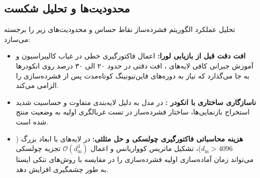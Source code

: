 \subsection{محدودیت‌ها و تحلیل شکست}
تحلیل عملکرد الگوریتم فشرده‌ساز  نقاط حساس و محدودیت‌های زیر را برجسته می‌سازد:
\begin{itemize}
    \item \textbf{افت دقت قبل از بازیابی لورا:} اعمال فاکتورگیری خطی در غیاب کالیبراسیون و آموزش جبرانی کافی لایه‌های ، افت دقتی در حدود ۲۰ الی ۳۰ درصد روی انکودرها به جا می‌گذارد که نیاز به دوره‌های فاین‌تیونینگ کوتاه‌مدت پس از فشرده‌سازی را الزامی می‌کند.
    \item \textbf{ناسازگاری ساختاری با انکودر :} در مدل  به دلیل لایه‌بندی متفاوت و حساسیت شدید استخراج بازنمایی‌ها، ساختار فشرده‌ساز در تست غربالگری اولیه به وضعیت  منتج شده است.
    \item \textbf{هزینه محاسباتی فاکتورگیری چولسکی و حل مثلثی:} در لایه‌های با ابعاد بزرگ ($d_{\text{in}} > 4096$)، تشکیل ماتریس کوواریانس و اعمال $\mathcal{O}(d_{\text{in}}^3)$ تجزیه چولسکی می‌تواند زمان آماده‌سازی اولیه فشرده‌سازی را در مقایسه با روش‌های تنکی ایستا به طور چشمگیری افزایش دهد.
\end{itemize}

